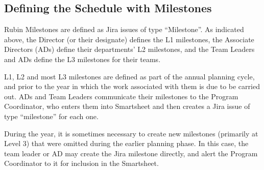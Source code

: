 \subsection{Defining the Schedule with Milestones}

Rubin Milestones are defined as Jira issues of type ``Milestone''. As indicated above, the Director (or their designate) defines the L1 milestones, the Associate Directors (ADs) define their departments' L2 milestones, and the Team Leaders and ADs define the L3 milestones for their teams.

L1, L2 and most L3 milestones are defined as part of the annual planning cycle, and prior to the year in which the work associated with them is due to be carried out. ADs and Team Leaders communicate their milestones to the Program Coordinator, who enters them into Smartsheet and then creates a Jira issue of type ``milestone'' for each one. 

During the year, it is sometimes necessary to create new milestones (primarily at Level 3) that were omitted during the earlier planning phase. In this case, the team leader or AD may create the Jira milestone directly, and alert the Program Coordinator to it for inclusion in the Smartsheet. 

